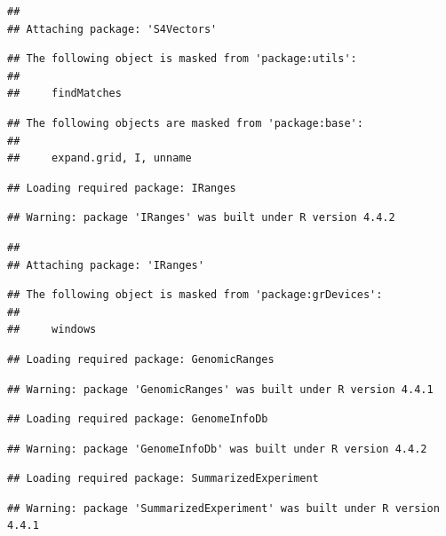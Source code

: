 \documentclass[
]{article}
\begin{document}
\begin{verbatim}
## 
## Attaching package: 'S4Vectors'
\end{verbatim}

\begin{verbatim}
## The following object is masked from 'package:utils':
## 
##     findMatches
\end{verbatim}

\begin{verbatim}
## The following objects are masked from 'package:base':
## 
##     expand.grid, I, unname
\end{verbatim}

\begin{verbatim}
## Loading required package: IRanges
\end{verbatim}

\begin{verbatim}
## Warning: package 'IRanges' was built under R version 4.4.2
\end{verbatim}

\begin{verbatim}
## 
## Attaching package: 'IRanges'
\end{verbatim}

\begin{verbatim}
## The following object is masked from 'package:grDevices':
## 
##     windows
\end{verbatim}

\begin{verbatim}
## Loading required package: GenomicRanges
\end{verbatim}

\begin{verbatim}
## Warning: package 'GenomicRanges' was built under R version 4.4.1
\end{verbatim}

\begin{verbatim}
## Loading required package: GenomeInfoDb
\end{verbatim}

\begin{verbatim}
## Warning: package 'GenomeInfoDb' was built under R version 4.4.2
\end{verbatim}

\begin{verbatim}
## Loading required package: SummarizedExperiment
\end{verbatim}

\begin{verbatim}
## Warning: package 'SummarizedExperiment' was built under R version 4.4.1
\end{verbatim}
\end{document}
